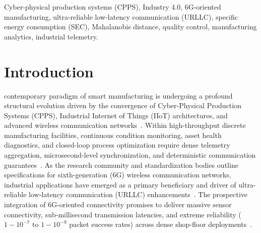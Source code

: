 \documentclass[journal]{IEEEtran}
\begin{document}
\begin{IEEEkeywords}
Cyber-physical production systems (CPPS), Industry 4.0, 6G-oriented manufacturing, ultra-reliable low-latency communication (URLLC), specific energy consumption (SEC), Mahalanobis distance, quality control, manufacturing analytics, industrial telemetry.
\end{IEEEkeywords}

\section{Introduction}
 contemporary paradigm of smart manufacturing is undergoing a profound structural evolution driven by the convergence of Cyber-Physical Production Systems (CPPS), Industrial Internet of Things (IIoT) architectures, and advanced wireless communication networks~\cite{Lee2015, Monostori2016, Tao2018}. Within high-throughput discrete manufacturing facilities, continuous condition monitoring, asset health diagnostics, and closed-loop process optimization require dense telemetry aggregation, microsecond-level synchronization, and deterministic communication guarantees~\cite{Sisinni2018}. As the research community and standardization bodies outline specifications for sixth-generation (6G) wireless communication networks, industrial applications have emerged as a primary beneficiary and driver of ultra-reliable low-latency communication (URLLC) enhancements~\cite{Saad2020, Tataria2021}. The prospective integration of 6G-oriented connectivity promises to deliver massive sensor connectivity, sub-millisecond transmission latencies, and extreme reliability ($1-10^{-7}$ to $1-10^{-9}$ packet success rates) across dense shop-floor deployments~\cite{Popovski2018, Peng2023, Zhan2020}.
\end{document}
